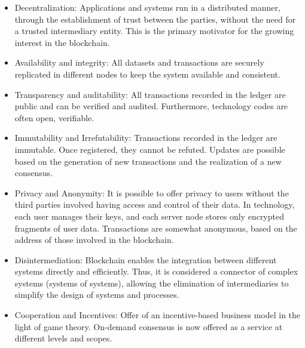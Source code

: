 \begin{itemize}
\item Decentralization: Applications and systems run in a distributed manner, through the establishment of trust between the parties, without the need for a trusted intermediary entity. This is the primary motivator for the growing interest in the blockchain.
\item Availability and integrity: All datasets and transactions are securely replicated in different nodes to keep the system available and consistent.
\item Transparency and auditability: All transactions recorded in the ledger are public and can be verified and audited. Furthermore, technology codes are often open, verifiable.
\item Immutability and Irrefutability: Transactions recorded in the ledger are immutable. Once registered, they cannot be refuted. Updates are possible based on the generation of new transactions and the realization of a new consensus.
\item Privacy and Anonymity: It is possible to offer privacy to users without the third parties involved having access and control of their data. In technology, each user manages their keys, and each server node stores only encrypted fragments of user data. Transactions are somewhat anonymous, based on the address of those involved in the blockchain.
\item Disintermediation: Blockchain enables the integration between different systems directly and efficiently. Thus, it is considered a connector of complex systems (systems of systems), allowing the elimination of intermediaries to simplify the design of systems and processes.
\item Cooperation and Incentives: Offer of an incentive-based business model in the light of game theory. On-demand consensus is now offered as a service at different levels and scopes.
\end{itemize}

